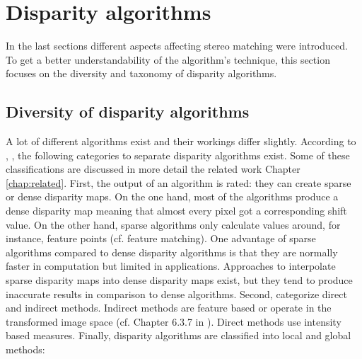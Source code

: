 \newpage

\section{Disparity algorithms}

In the last sections different aspects affecting stereo matching were introduced.
To get a better understandability of the algorithm's technique, this section focuses on the diversity and taxonomy of disparity algorithms.

\subsection*{Diversity of disparity algorithms}

A lot of different algorithms exist and their workings differ slightly.
According to \citeauthor{cyganek2011introduction} \citep{cyganek2011introduction}, \citeauthor{scharstein2002taxonomy} \citep{scharstein2002taxonomy}, the following categories to separate disparity algorithms exist.
Some of these classifications are discussed in more detail the related work Chapter \ref{chap:related}.
\newline\newline\noindent First, the output of an algorithm is rated: they can create sparse or dense disparity maps.
On the one hand, most of the algorithms produce a dense disparity map meaning that almost every pixel got a corresponding shift value.
On the other hand, sparse algorithms only calculate values around, for instance, feature points (cf. feature matching).
One advantage of sparse algorithms compared to dense disparity algorithms is that they are normally faster in computation but limited in applications.
Approaches to interpolate sparse disparity maps into dense disparity maps exist, but they tend to produce inaccurate results in comparison to dense algorithms.
\newline\newline\noindent Second, \citeauthor{cyganek2011introduction} \citep{cyganek2011introduction} categorize direct and indirect methods.
Indirect methods are feature based or operate in the transformed image space (cf. Chapter 6.3.7 in \citep{cyganek2011introduction}).
Direct methods use intensity based measures.
\newline\newline\noindent Finally, disparity algorithms are classified into local and global methods:

